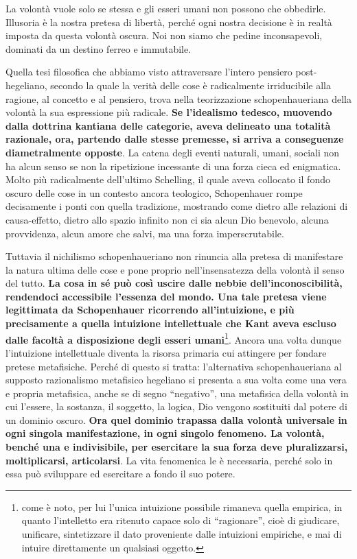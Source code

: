 La volontà vuole solo se stessa e gli esseri umani non possono che obbedirle. Illusoria è la nostra pretesa di libertà, perché ogni nostra decisione è in realtà imposta da questa volontà oscura. Noi non siamo che pedine inconsapevoli, dominati da un destino ferreo e immutabile.

Quella tesi filosofica che abbiamo visto attraversare l’intero pensiero post-hegeliano, secondo la quale la verità delle cose è radicalmente irriducibile alla ragione, al concetto e al pensiero, trova nella teorizzazione schopenhaueriana della volontà la sua espressione più radicale. \textbf{Se l’idealismo tedesco, muovendo dalla dottrina kantiana delle categorie, aveva delineato una totalità razionale, ora, partendo dalle stesse premesse, si arriva a conseguenze diametralmente opposte}. La catena degli eventi naturali, umani, sociali non ha alcun senso se non la ripetizione incessante di una forza cieca ed enigmatica.
Molto più radicalmente dell’ultimo Schelling, il quale aveva collocato il fondo oscuro delle cose in un contesto ancora teologico, Schopenhauer rompe decisamente i ponti con quella tradizione, mostrando come dietro alle relazioni di causa-effetto, dietro allo spazio infinito non ci sia alcun Dio benevolo, alcuna provvidenza, alcun amore che salvi, ma una forza imperscrutabile. 

Tuttavia il nichilismo schopenhaueriano non rinuncia alla pretesa di manifestare la natura ultima delle cose e pone proprio nell’insensatezza della volontà il senso del tutto. \textbf{La cosa in sé può così uscire dalle nebbie dell’inconoscibilità, rendendoci accessibile l’essenza del mondo. Una tale pretesa viene legittimata da Schopenhauer ricorrendo all’intuizione, e più precisamente a quella intuizione intellettuale che Kant aveva escluso dalle facoltà a disposizione degli esseri umani}\footnote{come è noto, per lui l’unica intuizione possibile rimaneva quella empirica, in quanto l’intelletto era ritenuto capace solo di “ragionare”, cioè di giudicare, unificare, sintetizzare il dato proveniente dalle intuizioni empiriche, e mai di intuire direttamente un qualsiasi oggetto.}.
Ancora una volta dunque l’intuizione intellettuale diventa la risorsa primaria cui attingere per fondare pretese metafisiche. Perché di questo si tratta: l’alternativa schopenhaueriana al supposto razionalismo metafisico hegeliano si presenta a sua volta come una vera e propria metafisica, anche se di segno “negativo”, una metafisica della volontà in cui l’essere, la sostanza, il soggetto, la logica, Dio vengono sostituiti dal potere di un dominio oscuro. \textbf{Ora quel dominio trapassa dalla volontà universale in ogni singola manifestazione, in ogni singolo fenomeno. La volontà, benché una e indivisibile, per esercitare la sua forza deve pluralizzarsi, moltiplicarsi, articolarsi}. La vita fenomenica le è necessaria, perché solo in essa può sviluppare ed esercitare a fondo il suo potere. 

